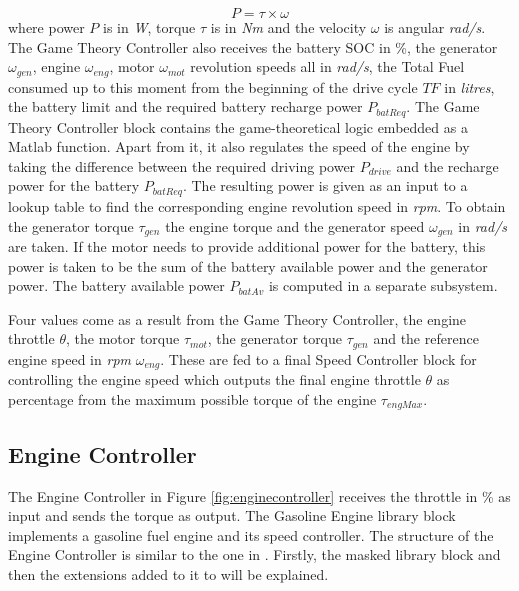 \begin{equation}
P = \tau \times \omega
\end{equation}
where power $P$ is in \textit{W}, torque $\tau$ is in \textit{Nm} and the velocity $\omega$ is angular \textit{rad/s}. The Game Theory Controller also receives the battery SOC in \%, the generator $\omega_{gen}$, engine $\omega_{eng}$, motor $\omega_{mot}$ revolution speeds all in \textit{rad/s}, the Total Fuel consumed up to this moment from the beginning of the drive cycle $TF$ in \textit{litres}, the battery limit and the required battery recharge power $P_{batReq}$. The Game Theory Controller block contains the game-theoretical logic embedded as a Matlab function. Apart from it, it also regulates the speed of the engine by taking the difference between the required driving power $P_{drive}$ and the recharge power for the battery $P_{batReq}$. The resulting power is given as an input to a lookup table to find the corresponding engine revolution speed in \textit{rpm}. To obtain the generator torque $\tau_{gen}$ the engine torque and the generator speed $\omega_{gen}$ in \textit{rad/s} are taken. If the motor needs to provide additional power for the battery, this power is taken to be the sum of the battery available power and the generator power. The battery available power $P_{batAv}$ is computed in a separate subsystem. 

Four values come as a result from the Game Theory Controller, the engine throttle $\theta$, the motor torque $\tau_{mot}$, the generator torque $\tau_{gen}$ and the reference engine speed in \textit{rpm} $\omega_{eng}$. These are fed to a final Speed Controller block for controlling the engine speed which outputs the final engine throttle $\theta$ as percentage from the maximum possible torque of the engine $\tau_{engMax}$.

\subsection{Engine Controller}
The Engine Controller in Figure \ref{fig:enginecontroller} receives the throttle in \% as input and sends the torque as output. The Gasoline Engine library block \citep{engineMatlab} implements a gasoline fuel engine and its speed controller. The structure of the Engine Controller is similar to the one in \citet{hevMatlab}. Firstly, the masked library block and then the extensions added to it to will be explained.

